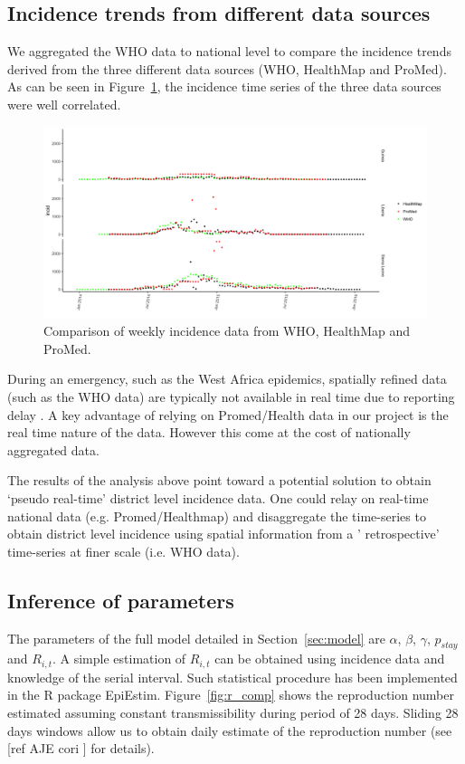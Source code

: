 \documentclass[11pt,]{article}
\begin{document}
\subsection{Incidence trends from different data sources}
We aggregated the WHO data to national level to compare the incidence
trends derived from the three different data sources (WHO, HealthMap
and ProMed). As can be seen in Figure~\ref{fig:incid_comp}, the incidence time series
of the three data sources were well correlated.

\begin{figure}
    \centering
        \includegraphics[]{ms6-figures/who_hm_pm_weekly_incid-1}
        \caption{Comparison of weekly incidence data from WHO, HealthMap and ProMed.}
        \label{fig:incid_comp}
  \end{figure}

During an emergency, such as the West Africa epidemics, spatially refined data (such as the WHO data)
are typically not available in real time due to reporting delay \citep{cori2017key}. A key advantage 
of relying on Promed/Health data in our project is the real time nature of the data. However this come at the cost
of nationally aggregated data.

The results of the analysis above point toward a potential solution to obtain `pseudo real-time' district
 level incidence data. One could relay on real-time national data (e.g. Promed/Healthmap) and disaggregate 
the time-series to obtain district level incidence using spatial information from a ' retrospective'
time-series at finer scale (i.e. WHO data).
\FloatBarrier
\subsection{Inference of parameters}

The parameters of the full model detailed in Section~\ref{sec:model} are
$\alpha$, $\beta$, $\gamma$, $p_{stay}$ and $R_{i, t}$. A simple
estimation of $R_{i, t}$ can be obtained using incidence data and knowledge of the serial interval.
Such statistical procedure has been implemented in the
R package EpiEstim. Figure~\ref{fig:r_comp} shows the
reproduction number estimated assuming constant transmissibility during period of 28 days. 
Sliding  28 days windows allow us to obtain daily estimate of the reproduction number (see [ref AJE cori ] for details).
\end{document}
